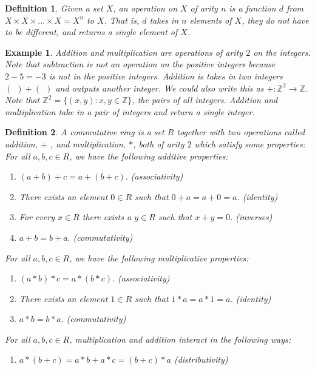 \documentclass{article}
\theoremstyle{problemstyle}
\newtheorem{example}{Example}
\newtheorem{definition}{Definition}
\begin{document}
\begin{definition}
Given a set $X$, an operation on $X$ of arity $n$ is a function $d$ from $X\times X \times ... \times X = X^n$ to $X$. That is, $d$ takes in $n$ elements of $X$, they do not have to be different, and returns a single element of $X$.  
\end{definition}

\begin{example}
Addition and multiplication are operations of arity $2$ on the integers. Note that subtraction is not an operation on the positive integers because $2-5 = -3$ is not in the positive integers.  Addition is takes in two integers $( \ \ )+( \ \ )$ and outputs another integer. We could also write this as $+:\mathbb{Z}^2 \rightarrow \mathbb{Z}$. Note that $\mathbb{Z}^2 = \{(x,y):x,y \in \mathbb{Z}\}$, the pairs of all integers. Addition and multiplication take in a pair of integers and return a single integer. 
\end{example}

\begin{definition}
A commutative ring is a set $R$ together with two operations called addition, $+$ ,  and multiplication, $*$,  both of arity $2$ which satisfy some properties:\\

For all $a,b,c \in R$, we have the following additive properties:
\begin{enumerate}
\item $(a+b)+c = a+(b+c).$ (associativity)
\item There exists an element $0 \in R$ such that $0 + a = a + 0 = a$. (identity)
\item For every $x \in R$ there exists a $y \in R$ such that $x + y  = 0$. (inverses)
\item $a+b = b+a.$ (commutativity)
\end{enumerate}
For all $a,b,c \in R$, we have the following multiplicative properties:
\begin{enumerate}
\item $(a*b)*c = a*(b*c).$ (associativity)
\item There exists an element $1 \in R$ such that $1*a = a*1 = a$. (identity)
\item $a*b = b*a.$ (commutativity)
\end{enumerate}
For all $a,b,c \in R$, multiplication and addition interact in the following ways:
\begin{enumerate}
\item $a*(b+c) = a*b + a*c = (b+c)*a$ (distributivity)
\end{enumerate}
\end{definition}
\end{document}
